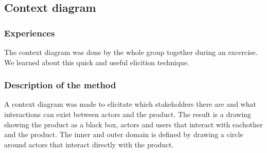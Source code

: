


\subsection{Context diagram}

\subsubsection{Experiences}
The context diagram was done by the whole group together during an excercise. We learned about this quick and useful elicition technique.
\subsubsection{Description of the method}
A context diagram was made to elicitate which stakeholders there are and what interactions can exist between actors and the product. The result is a drawing showing the product as a black box, actors and users that interact with eachother and the product. The inner and outer domain is defined by drawing a circle around actors that interact directly with the product.

